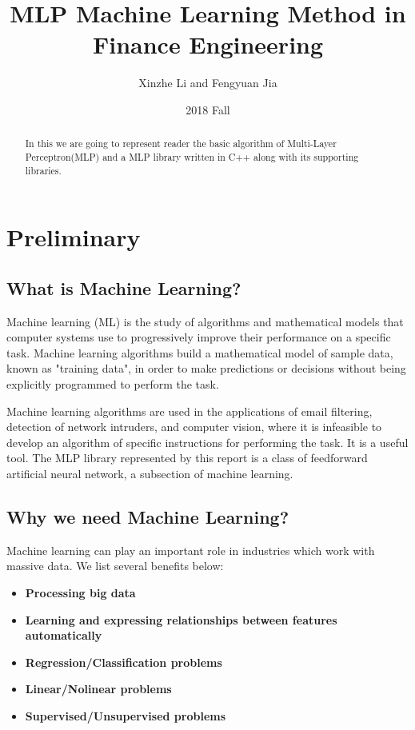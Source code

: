 \documentclass[a4paper]{article}
\title{MLP Machine Learning Method in Finance Engineering}
\author{Xinzhe Li and Fengyuan Jia}
\date{2018 Fall}
\begin{document}
\maketitle

\begin{abstract}
In this we are going to represent reader the basic algorithm of Multi-Layer Perceptron(MLP) and a MLP library written in C++ along with its supporting libraries.
\end{abstract}

\section{Preliminary}
\label{sec:introduction}
\subsection{What is Machine Learning?}
Machine learning (ML) is the study of algorithms and mathematical models that computer systems use to progressively improve their performance on a specific task. Machine learning algorithms build a mathematical model of sample data, known as "training data", in order to make predictions or decisions without being explicitly programmed to perform the task.\cite{nano3}

Machine learning algorithms are used in the applications of email filtering, detection of network intruders, and computer vision, where it is infeasible to develop an algorithm of specific instructions for performing the task. It is a useful tool. The MLP library represented by this report is a class of feedforward artificial neural network, a subsection of machine learning. 
\subsection{Why we need Machine Learning?}

Machine learning can play an important role in industries which work with massive data. We list several benefits below:

\begin{itemize}
	\item{\textbf{Processing big data}}
    \item{\textbf{Learning and expressing relationships between features automatically} }
    \item{\textbf{Regression/Classification problems} }
    \item{\textbf{Linear/Nolinear problems} }
    \item{\textbf{Supervised/Unsupervised problems} }
\end{itemize}
\end{document}
